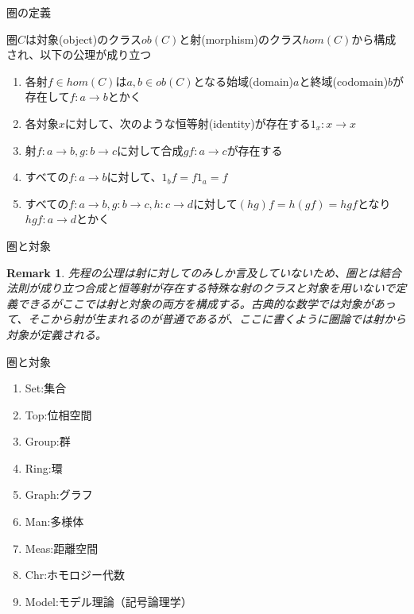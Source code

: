 \documentclass[unicode,12pt,aspectratio=169]{beamer}
\newtheorem*{remark}{Remark}
\begin{document}
\begin{frame}{圏の定義}
    \begin{tcolorbox}
        \begin{definition}
            圏$C$は対象(object)のクラス$ob(C)$と射(morphism)のクラス$hom(C)$から構成され、以下の公理が成り立つ
            \begin{enumerate}
                \item 各射$f\in hom(C)$は$a,b\in ob(C)$となる始域(domain)$a$と終域(codomain)$b$が存在して$f:a \rightarrow b$とかく
                \item 各対象$x$に対して、次のような恒等射(identity)が存在する$1_x:x \rightarrow x$
                \item 射$f: a \rightarrow b,g: b \rightarrow c$に対して合成$gf: a \rightarrow c$が存在する
                \item すべての$f:a \rightarrow b$に対して、$1_bf = f1_a = f$
                \item すべての$f:a \rightarrow b,g:b \rightarrow c,h:c \rightarrow d$に対して$(hg)f = h(gf) = hgf$となり$hgf: a\rightarrow d$とかく
            \end{enumerate}
        \end{definition}
    \end{tcolorbox}
\end{frame}
\begin{frame}{圏と対象}
    \begin{tcolorbox}
        \begin{remark}
            先程の公理は射に対してのみしか言及していないため、圏とは結合法則が成り立つ合成と恒等射が存在する特殊な射のクラスと対象を用いないで定義できるがここでは射と対象の両方を構成する。古典的な数学では対象があって、そこから射が生まれるのが普通であるが、ここに書くように圏論では射から対象が定義される。
        \end{remark}
    \end{tcolorbox}
\end{frame}
\begin{frame}{圏と対象}
    \begin{tcolorbox}
        \begin{example}
            \begin{enumerate}
                \item Set:集合
                \item Top:位相空間
                \item Group:群
                \item Ring:環
                \item Graph:グラフ
                \item Man:多様体
                \item Meas:距離空間
                \item Chr:ホモロジー代数
                \item Model:モデル理論（記号論理学）
            \end{enumerate}
        \end{example}
    \end{tcolorbox}
\end{frame}
\end{document}
